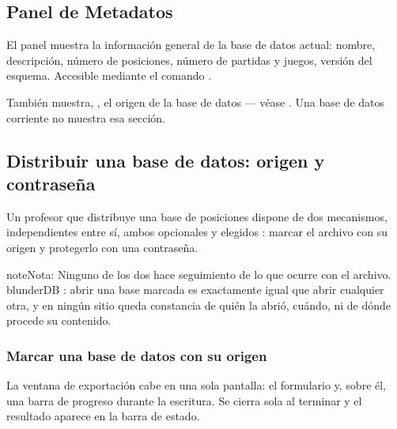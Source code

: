 \documentclass[letterpaper,10pt,spanish]{sphinxmanual}
\begin{document}
\subsection{Panel de Metadatos}
\label{\detokenize{manuel:panneau-metadonnees}}\label{\detokenize{manuel:panneau-metadata}}
\sphinxAtStartPar
El panel  muestra la información general de la base de datos actual: nombre, descripción, número de posiciones, número de partidas y juegos, versión del esquema. Accesible mediante el comando .

\sphinxAtStartPar
También muestra, , el origen de la base de datos — véase {\hyperref[\detokenize{manuel:diffusion-controlee}]{}}. Una base de datos corriente no muestra esa sección.


\subsection{Distribuir una base de datos: origen y contraseña}
\label{\detokenize{manuel:diffuser-une-base-origine-et-mot-de-passe}}\label{\detokenize{manuel:diffusion-controlee}}
\sphinxAtStartPar
Un profesor que distribuye una base de posiciones dispone de dos mecanismos, independientes entre sí, ambos opcionales y elegidos : marcar el archivo con su origen y protegerlo con una contraseña.

\begin{sphinxadmonition}{note}{Nota:}
\sphinxAtStartPar
Ninguno de los dos hace seguimiento de lo que ocurre con el archivo. blunderDB : abrir una base marcada es exactamente igual que abrir cualquier otra, y en ningún sitio queda constancia de quién la abrió, cuándo, ni de dónde procede su contenido.
\end{sphinxadmonition}


\subsubsection{Marcar una base de datos con su origen}
\label{\detokenize{manuel:marquer-une-base-de-son-origine}}
\sphinxAtStartPar
La ventana de exportación cabe en una sola pantalla: el formulario y, sobre él, una barra de progreso durante la escritura. Se cierra sola al terminar y el resultado aparece en la barra de estado.
\end{document}

